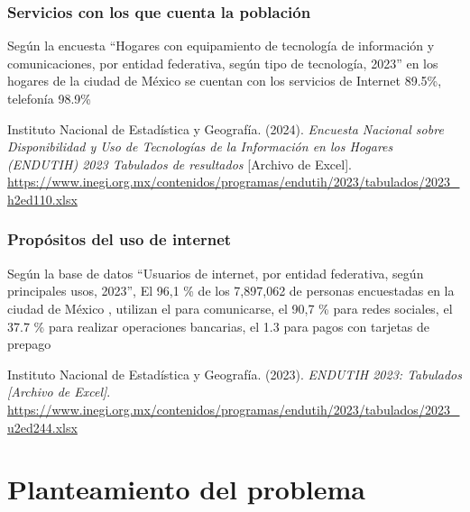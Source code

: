 \documentclass{article}
\begin{document}
\subsubsection{Servicios con los que cuenta la poblaci{\'{o}}n}

Seg{{\'{u}}}n la encuesta ``Hogares con equipamiento de tecnolog{\'{i}}a de informaci{\'{o}}n y comunicaciones, por entidad federativa, seg{{\'{u}}}n tipo de tecnolog{\'{i}}a, 2023'' en los hogares de la ciudad de M{\'{e}}xico se cuentan con los servicios de Internet 89.5\%, telefon{\'{i}}a 98.9\%

Instituto Nacional de Estad{\'{i}}stica y Geograf{\'{i}}a. (2024). \textit{Encuesta Nacional sobre Disponibilidad y Uso de Tecnolog{\'{i}}as de la Informaci{\'{o}}n en los Hogares (ENDUTIH) 2023 \textendash{} Tabulados de resultados} {[}Archivo de Excel{]}. \url{https://www.inegi.org.mx/contenidos/programas/endutih/2023/tabulados/2023_h2ed110.xlsx}

\subsubsection{Prop{\'{o}}sitos del uso de internet}

Seg{{\'{u}}}n la base de datos ``Usuarios de internet, por entidad federativa, seg{{\'{u}}}n principales usos, 2023'', El 96,1 \% de los 7,897,062 de personas encuestadas en la ciudad de M{\'{e}}xico , utilizan el {\textquestiondown} para comunicarse, el 90,7 \% para redes sociales, el 37.7 \% para realizar operaciones bancarias, el 1.3 para pagos con tarjetas de prepago

Instituto Nacional de Estad{\'{i}}stica y Geograf{\'{i}}a. (2023). \textit{ENDUTIH 2023: Tabulados {[}Archivo de Excel{]}}. \url{https://www.inegi.org.mx/contenidos/programas/endutih/2023/tabulados/2023_u2ed244.xlsx}

\section{\label{ref-002}Planteamiento del problema}


\end{document}
